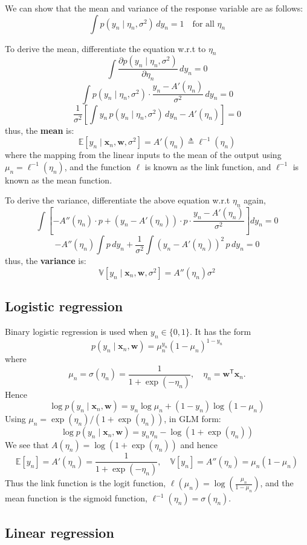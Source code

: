 \documentclass[11pt]{article}
\begin{document}
We can show that the mean and variance of the response variable are as follows:
\[
\int p(y_n \mid \eta_n, \sigma^2)\, dy_n = 1 \quad \text{for all } \eta_n
\]

To derive the mean, differentiate the equation w.r.t to $\eta_n$
\[ \int \frac{\partial p(y_n \mid \eta_n, \sigma^2)}{\partial \eta_n}\, dy_n = 0 \]
\[\int p(y_n\mid\eta_n,\sigma^2) \cdot \frac{y_n - A'(\eta_n)}{\sigma^2}\, dy_n = 0\]
\[\frac{1}{\sigma^2}\left[\int y_n\, p(y_n\mid\eta_n,\sigma^2)\, dy_n - A'(\eta_n)\right] = 0\]
thus, the \textbf{mean} is:
\[
\mathbb{E}\left[y_n \mid \boldsymbol{x}_n, \boldsymbol{w}, \sigma^2\right]
= A'(\eta_n) \triangleq \ell^{-1}(\eta_n)
\]
where the mapping from the linear inputs to the mean of the output using $\mu_n = \ell^{-1}(\eta_n)$, and the function $\ell$ is known as the link function, and $\ell^{-1}$ is known as the mean function. 

To derive the variance, differentiate the above equation w.r.t $\eta_n$ again,
\[
\int \left[-A''(\eta_n)\cdot p + (y_n - A'(\eta_n)) \cdot p \cdot \frac{y_n - A'(\eta_n)}{\sigma^2}\right] dy_n = 0
\]
\[-A''(\eta_n)\int p\, dy_n + \frac{1}{\sigma^2}\int (y_n - A'(\eta_n))^2\, p\, dy_n = 0
\]
thus, the \textbf{variance} is:
\[
\mathbb{V}\left[y_n \mid \boldsymbol{x}_n, \boldsymbol{w}, \sigma^2\right]
= A''(\eta_n)\sigma^2
\]

\subsection{Logistic regression}

Binary logistic regression is used when $y_n \in \{0,1\}$. It has the form
\[
p(y_n \mid \boldsymbol{x}_n, \boldsymbol{w})
= \mu_n^{y_n}(1-\mu_n)^{1-y_n}
\]
where
\[
\mu_n = \sigma(\eta_n) = \frac{1}{1 + \exp(-\eta_n)}, \quad
\eta_n = \boldsymbol{w}^{\mathsf{T}}\boldsymbol{x}_n.
\]
Hence
\[
\log p(y_n \mid \boldsymbol{x}_n, \boldsymbol{w})
= y_n\log \mu_n + (1-y_n)\log(1-\mu_n)
\]
Using $\mu_n = \exp(\eta_n)/(1+\exp(\eta_n))$, in GLM form:
\[
\log p(y_n \mid \boldsymbol{x}_n, \boldsymbol{w})
= y_n\eta_n - \log(1 + \exp(\eta_n))
\]
We see that $A(\eta_n) = \log(1 + \exp(\eta_n))$ and hence
\[
\mathbb{E}[y_n] = A'(\eta_n) = \frac{1}{1 + \exp(-\eta_n)},\quad \mathbb{V}[y_n] = A''(\eta_n) = \mu_n(1-\mu_n)
\]
Thus the link function is the logit function, $\ell(\mu_n) = \log\left(\frac{\mu_n}{1-\mu_n}\right)$, and the mean function is the sigmoid function, $\ell^{-1}(\eta_n) = \sigma(\eta_n)$.

\subsection{Linear regression}
\end{document}
